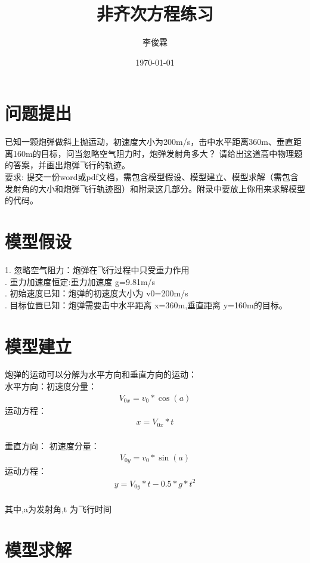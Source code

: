 \documentclass{article}
\title{非齐次方程练习}
\author{李俊霖}
\date{\today}
\begin{document}
\maketitle
\section{问题提出}
已知一颗炮弹做斜上抛运动，初速度大小为200m/s，击中水平距离360m、垂直距离160m的目标，问当忽略空气阻力时，炮弹发射角多大？
请给出这道高中物理题的答案，并画出炮弹飞行的轨迹。
\\ \indent 要求: 提交一份word或pdf文档，需包含模型假设、模型建立、模型求解（需包含发射角的大小和炮弹飞行轨迹图）和附录这几部分。附录中要放上你用来求解模型的代码。  
\section{模型假设}
1. 忽略空气阻力：炮弹在飞行过程中只受重力作用
\\ . 重力加速度恒定:重力加速度 g=9.81m/s
\\ . 初始速度已知：炮弹的初速度大小为 v0=200m/s
\\ . 目标位置已知：炮弹需要击中水平距离 x=360m,垂直距离 y=160m的目标。
\section{模型建立}
炮弹的运动可以分解为水平方向和垂直方向的运动：
\\ \indent 水平方向：初速度分量：
\begin{eqnarray}
    V_{0x}=v_0*\cos(a)
\end{eqnarray}
运动方程：
\begin{eqnarray}
    x=V_{0x}*t
\end{eqnarray}
\\ \indent 垂直方向：
初速度分量：
\begin{eqnarray}
    V_{0y}=v_0*\sin(a)
\end{eqnarray}
运动方程：
\begin{eqnarray}
    y=V_{0y}*t-0.5*g*t^2
\end{eqnarray}
\\ \indent 其中,a为发射角,t 为飞行时间

\section{模型求解}
\end{document}
